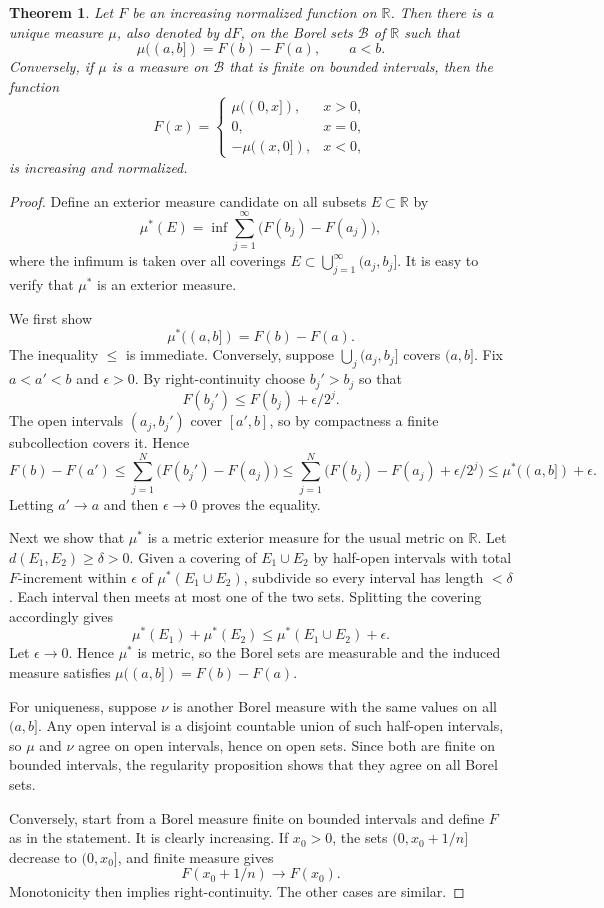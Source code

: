 \documentclass[11pt,openany]{book}
\newtheorem{theorem}{Theorem}[section]
\begin{document}
\begin{theorem}
Let $F$ be an increasing normalized function on $\mathbb R$. Then there is a unique measure $\mu$, also denoted by $dF$, on the Borel sets $\mathcal B$ of $\mathbb R$ such that
\[
\mu((a,b])=F(b)-F(a),\qquad a<b.
\]
Conversely, if $\mu$ is a measure on $\mathcal B$ that is finite on bounded intervals, then the function
\[
F(x)=
\begin{cases}
\mu((0,x]),&x>0,\\
0,&x=0,\\
-\mu((x,0]),&x<0,
\end{cases}
\]
is increasing and normalized.
\end{theorem}

\begin{proof}
Define an exterior measure candidate on all subsets $E\subset\mathbb R$ by
\[
\mu^*(E)=\inf\sum_{j=1}^{\infty}\bigl(F(b_j)-F(a_j)\bigr),
\]
where the infimum is taken over all coverings $E\subset\bigcup_{j=1}^{\infty}(a_j,b_j]$.
It is easy to verify that $\mu^*$ is an exterior measure.

We first show
\[
\mu^*((a,b])=F(b)-F(a).
\]
The inequality $\leq$ is immediate. Conversely, suppose $\bigcup_j(a_j,b_j]$ covers $(a,b]$. Fix $a<a'<b$ and $\epsilon>0$. By right-continuity choose $b_j'>b_j$ so that
\[
F(b_j')\leq F(b_j)+\epsilon/2^j.
\]
The open intervals $(a_j,b_j')$ cover $[a',b]$, so by compactness a finite subcollection covers it. Hence
\[
F(b)-F(a')
\leq\sum_{j=1}^N\bigl(F(b_j')-F(a_j)\bigr)
\leq\sum_{j=1}^N\bigl(F(b_j)-F(a_j)+\epsilon/2^j\bigr)
\leq\mu^*((a,b])+\epsilon.
\]
Letting $a'\to a$ and then $\epsilon\to0$ proves the equality.

Next we show that $\mu^*$ is a metric exterior measure for the usual metric on $\mathbb R$. Let $d(E_1,E_2)\geq\delta>0$. Given a covering of $E_1\cup E_2$ by half-open intervals with total $F$-increment within $\epsilon$ of $\mu^*(E_1\cup E_2)$, subdivide so every interval has length $<\delta$. Each interval then meets at most one of the two sets. Splitting the covering accordingly gives
\[
\mu^*(E_1)+\mu^*(E_2)\leq\mu^*(E_1\cup E_2)+\epsilon.
\]
Let $\epsilon\to0$. Hence $\mu^*$ is metric, so the Borel sets are measurable and the induced measure satisfies $\mu((a,b])=F(b)-F(a)$.

For uniqueness, suppose $\nu$ is another Borel measure with the same values on all $(a,b]$. Any open interval is a disjoint countable union of such half-open intervals, so $\mu$ and $\nu$ agree on open intervals, hence on open sets. Since both are finite on bounded intervals, the regularity proposition shows that they agree on all Borel sets.

Conversely, start from a Borel measure finite on bounded intervals and define $F$ as in the statement. It is clearly increasing. If $x_0>0$, the sets $(0,x_0+1/n]$ decrease to $(0,x_0]$, and finite measure gives
\[
F(x_0+1/n)\to F(x_0).
\]
Monotonicity then implies right-continuity. The other cases are similar.
\end{proof}
\end{document}
